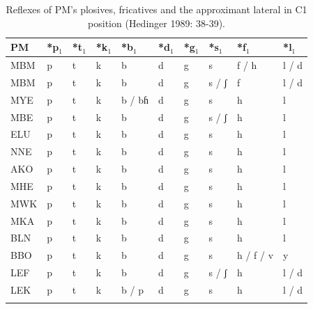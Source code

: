 \documentclass[output=paper,colorlinks,citecolor=brown
]{langscibook}
\begin{document}
\begin{table}
\caption{Reflexes of PM’s plosives, fricatives and the approximant lateral in C1 position (Hedinger 1989: 38-39).}
\label{tab:grollemundbrownrule:manenguba1}
 \begin{tabular}{llllllllll}
  \lsptoprule
\textbf{PM} & \textbf{*p$_1$} & \textbf{*t$_1$} & \textbf{*k$_1$} & \textbf{*b$_1$} & \textbf{*d$_1$} & \textbf{*g$_1$} & \textbf{*s$_1$} & \textbf{*f$_1$} & \textbf{*l$_1$} \\
\midrule
MBM         & p            & t            & k            & b            & d            & g            & s            & f / h        & l / d        \\
MBM         & p            & t            & k            & b            & d            & g            & s / ʃ        & f            & l / d        \\
MYE         & p            & t            & k            & b / bɦ       & d            & g            & s            & h            & l            \\
MBE         & p            & t            & k            & b            & d            & g            & s / ʃ        & h            & l            \\
ELU         & p            & t            & k            & b            & d            & g            & s            & h            & l            \\
NNE         & p            & t            & k            & b            & d            & g            & s            & h            & l            \\
AKO         & p            & t            & k            & b            & d            & g            & s            & h            & l            \\
MHE         & p            & t            & k            & b            & d            & g            & s            & h            & l            \\
MWK         & p            & t            & k            & b            & d            & g            & s            & h            & l            \\
MKA         & p            & t            & k            & b            & d            & g            & s            & h            & l            \\
BLN         & p            & t            & k            & b            & d            & g            & s            & h            & l            \\
BBO         & p            & t            & k            & b            & d            & g            & s            & h / f / v    & y            \\
LEF         & p            & t            & k            & b            & d            & g            & s / ʃ        & h            & l / d        \\
LEK         & p            & t            & k            & b / p        & d            & g            & s            & h            & l / d            \\ 
   \lspbottomrule
 \end{tabular}
\end{table}
\end{document}

